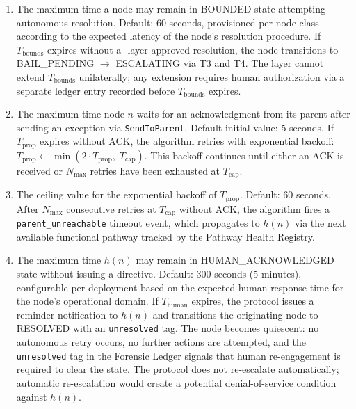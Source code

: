 \begin{enumerate}
\item[\textbf{$T_{\text{bounds}}$ --- Bounds Engine resolution timeout.}] The maximum time a node may remain in BOUNDED state attempting autonomous resolution. Default: 60 seconds, provisioned per node class according to the expected latency of the node's resolution procedure. If $T_{\text{bounds}}$ expires without a \fact-layer-approved resolution, the node transitions to BAIL\_PENDING $\rightarrow$ ESCALATING via T3 and T4. The \fact{} layer cannot extend $T_{\text{bounds}}$ unilaterally; any extension requires human authorization via a separate ledger entry recorded before $T_{\text{bounds}}$ expires.

\item[\textbf{$T_{\text{prop}}$ --- Per-hop propagation timeout.}] The maximum time node $n$ waits for an acknowledgment from its parent after sending an exception via \texttt{SendToParent}. Default initial value: 5 seconds. If $T_{\text{prop}}$ expires without ACK, the algorithm retries with exponential backoff: $T_{\text{prop}} \leftarrow \min(2 \cdot T_{\text{prop}},\; T_{\text{cap}})$. This backoff continues until either an ACK is received or $N_{\max}$ retries have been exhausted at $T_{\text{cap}}$.

\item[\textbf{$T_{\text{cap}}$ --- Maximum propagation timeout value.}] The ceiling value for the exponential backoff of $T_{\text{prop}}$. Default: 60 seconds. After $N_{\max}$ consecutive retries at $T_{\text{cap}}$ without ACK, the algorithm fires a \texttt{parent\_unreachable} timeout event, which propagates to $h(n)$ via the next available functional pathway tracked by the Pathway Health Registry.

\item[\textbf{$T_{\text{human}}$ --- Human acknowledgment timeout.}] The maximum time $h(n)$ may remain in HUMAN\_ACKNOWLEDGED state without issuing a directive. Default: 300 seconds (5 minutes), configurable per deployment based on the expected human response time for the node's operational domain. If $T_{\text{human}}$ expires, the protocol issues a reminder notification to $h(n)$ and transitions the originating node to RESOLVED with an \texttt{unresolved} tag. The node becomes quiescent: no autonomous retry occurs, no further actions are attempted, and the \texttt{unresolved} tag in the Forensic Ledger signals that human re-engagement is required to clear the state. The protocol does not re-escalate automatically; automatic re-escalation would create a potential denial-of-service condition against $h(n)$.
\end{enumerate}

